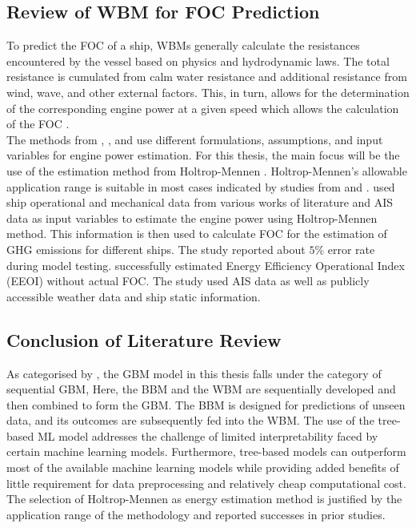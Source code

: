 \subsection{Review of WBM for FOC Prediction}\label{sec:wbm_review}

To predict the FOC of a ship, WBMs generally calculate the resistances encountered by the vessel based on physics and hydrodynamic laws. The total resistance is cumulated from calm water resistance and additional resistance from wind, wave, and other external factors. This, in turn, allows for the determination of the corresponding engine power at a given speed which allows the calculation of the FOC .\\

The methods from , , and  use different formulations, assumptions, and input variables for engine power estimation. For this thesis, the main focus will be the use of the estimation method from Holtrop-Mennen . Holtrop-Mennen's allowable application range is suitable in most cases indicated by studies from  and .  used ship operational and mechanical data from various works of literature and AIS data as input variables to estimate the engine power using Holtrop-Mennen method. This information is then used to calculate FOC for the estimation of GHG emissions for different ships. The study reported about $5\%$ error rate during model testing.  successfully estimated Energy Efficiency Operational Index (EEOI) without actual FOC. The study used AIS data as well as publicly accessible weather data and ship static information.\\

\subsection{Conclusion of Literature Review}\label{sec:lit_review_conclusion}

As categorised by , the GBM model in this thesis falls under the category of sequential GBM, Here, the BBM and the WBM are sequentially developed and then combined to form the GBM. The BBM is designed for predictions of unseen data, and its outcomes are subsequently fed into the WBM. The use of the tree-based ML model addresses the challenge of limited interpretability faced by certain machine learning models. Furthermore, tree-based models can outperform most of the available machine learning models while providing added benefits of little requirement for data preprocessing and relatively cheap computational cost. The selection of Holtrop-Mennen as energy estimation method is justified by the application range of the methodology and reported successes in prior studies.\\ 

